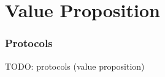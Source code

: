 
\chapter{Value Proposition} %
\label{AppendixA} %

\subsection{Protocols}
TODO: protocols (value proposition)